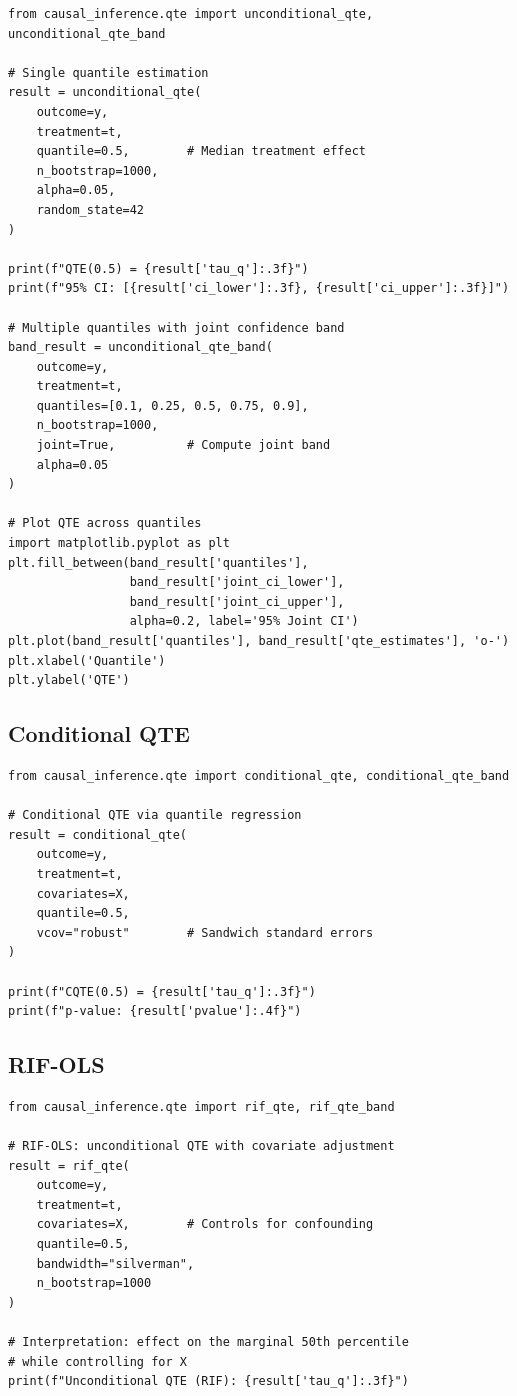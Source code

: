 \begin{verbatim}
from causal_inference.qte import unconditional_qte, unconditional_qte_band

# Single quantile estimation
result = unconditional_qte(
    outcome=y,
    treatment=t,
    quantile=0.5,        # Median treatment effect
    n_bootstrap=1000,
    alpha=0.05,
    random_state=42
)

print(f"QTE(0.5) = {result['tau_q']:.3f}")
print(f"95% CI: [{result['ci_lower']:.3f}, {result['ci_upper']:.3f}]")

# Multiple quantiles with joint confidence band
band_result = unconditional_qte_band(
    outcome=y,
    treatment=t,
    quantiles=[0.1, 0.25, 0.5, 0.75, 0.9],
    n_bootstrap=1000,
    joint=True,          # Compute joint band
    alpha=0.05
)

# Plot QTE across quantiles
import matplotlib.pyplot as plt
plt.fill_between(band_result['quantiles'],
                 band_result['joint_ci_lower'],
                 band_result['joint_ci_upper'],
                 alpha=0.2, label='95% Joint CI')
plt.plot(band_result['quantiles'], band_result['qte_estimates'], 'o-')
plt.xlabel('Quantile')
plt.ylabel('QTE')
\end{verbatim}

\subsection{Conditional QTE}

\begin{verbatim}
from causal_inference.qte import conditional_qte, conditional_qte_band

# Conditional QTE via quantile regression
result = conditional_qte(
    outcome=y,
    treatment=t,
    covariates=X,
    quantile=0.5,
    vcov="robust"        # Sandwich standard errors
)

print(f"CQTE(0.5) = {result['tau_q']:.3f}")
print(f"p-value: {result['pvalue']:.4f}")
\end{verbatim}

\subsection{RIF-OLS}

\begin{verbatim}
from causal_inference.qte import rif_qte, rif_qte_band

# RIF-OLS: unconditional QTE with covariate adjustment
result = rif_qte(
    outcome=y,
    treatment=t,
    covariates=X,        # Controls for confounding
    quantile=0.5,
    bandwidth="silverman",
    n_bootstrap=1000
)

# Interpretation: effect on the marginal 50th percentile
# while controlling for X
print(f"Unconditional QTE (RIF): {result['tau_q']:.3f}")
\end{verbatim}

